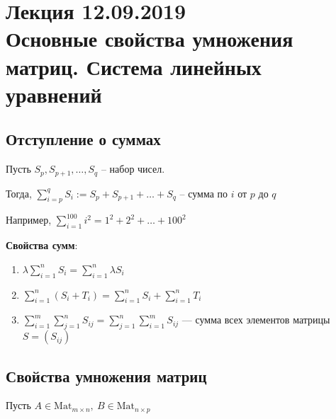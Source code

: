 \section{Лекция 12.09.2019 \\ Основные свойства умножения матриц. Система линейных уравнений}

\subsection{Отступление о суммах}

Пусть $S_p, S_{p + 1}, \dots, S_q$ -- набор чисел.

\bigskip
Тогда, $\sum_{i = p}^q S_i := S_p + S_{p + 1} + \dots + S_q $ -- сумма по $i$ от $p$ до $q$

\bigskip
Например, $\sum_{i=1}^{100} i^2 = 1^2 + 2^2 + \dots + 100^2$

\bigskip
\textbf{Свойства сумм}:
\begin{enumerate}
    \item $\lambda \sum_{i=1}^n S_i = \sum_{i=1}^n \lambda S_i $
    \item $\sum_{i=1}^n (S_i + T_i) = \sum_{i=1}^n S_i + \sum^n_{i=1} T_i $
    \item $\sum_{i=1}^m \sum_{j=1}^n S_{ij} = \sum_{j=1}^n \sum_{i=1}^m S_{ij}$ --- сумма всех элементов матрицы $S = (S_{ij})$
\end{enumerate}

\subsection{Свойства умножения матриц}

Пусть $A \in \text{Mat}_{m \times n}, \ B \in \text{Mat}_{n \times p}$

